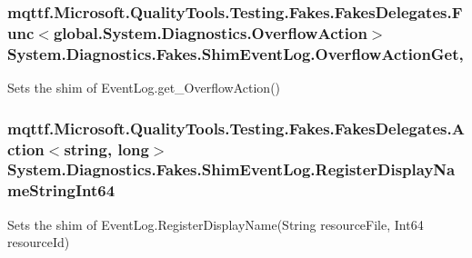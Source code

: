 \hypertarget{class_system_1_1_diagnostics_1_1_fakes_1_1_shim_event_log_aa4e6d5a8480c067f65e6ed8215ab7122}{
\subsubsection[{Overflow\-Action\-Get}]{\setlength{\rightskip}{0pt plus 5cm}mqttf.\-Microsoft.\-Quality\-Tools.\-Testing.\-Fakes.\-Fakes\-Delegates.\-Func$<$global.\-System.\-Diagnostics.\-Overflow\-Action$>$ System.\-Diagnostics.\-Fakes.\-Shim\-Event\-Log.\-Overflow\-Action\-Get\hspace{0.3cm}{\ttfamily [get]}, {\ttfamily [set]}}}\label{class_system_1_1_diagnostics_1_1_fakes_1_1_shim_event_log_aa4e6d5a8480c067f65e6ed8215ab7122}


Sets the shim of Event\-Log.\-get\-\_\-\-Overflow\-Action()

\hypertarget{class_system_1_1_diagnostics_1_1_fakes_1_1_shim_event_log_a4e1aeaea5fa7d6bdb60a73545b6a486e}{
\subsubsection[{Register\-Display\-Name\-String\-Int64}]{\setlength{\rightskip}{0pt plus 5cm}mqttf.\-Microsoft.\-Quality\-Tools.\-Testing.\-Fakes.\-Fakes\-Delegates.\-Action$<$string, long$>$ System.\-Diagnostics.\-Fakes.\-Shim\-Event\-Log.\-Register\-Display\-Name\-String\-Int64\hspace{0.3cm}{\ttfamily [set]}}}\label{class_system_1_1_diagnostics_1_1_fakes_1_1_shim_event_log_a4e1aeaea5fa7d6bdb60a73545b6a486e}


Sets the shim of Event\-Log.\-Register\-Display\-Name(\-String resource\-File, Int64 resource\-Id)

